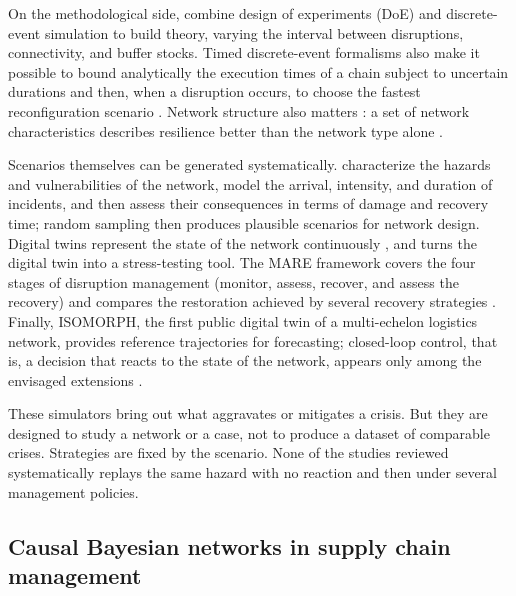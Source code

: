 On the methodological side, \citet{macdonald2018} combine design of experiments (DoE) and discrete-event simulation to build theory, varying the interval between disruptions, connectivity, and buffer stocks. Timed discrete-event formalisms also make it possible to bound analytically the execution times of a chain subject to uncertain durations and then, when a disruption occurs, to choose the fastest reconfiguration scenario \citep{rajah2025}. Network structure also matters \citep{kim2015}: a set of network characteristics describes resilience better than the network type alone \citep{li2020}.

Scenarios themselves can be generated systematically. \citet{klibi2012ejor} characterize the hazards and vulnerabilities of the network, model the arrival, intensity, and duration of incidents, and then assess their consequences in terms of damage and recovery time; random sampling then produces plausible scenarios for network design. Digital twins represent the state of the network continuously \citep{ivanovdolgui2021ppc}, and \citet{ivanov2023} turns the digital twin into a stress-testing tool. The MARE framework covers the four stages of disruption management (monitor, assess, recover, and assess the recovery) and compares the restoration achieved by several recovery strategies \citep{ramzy2022}. Finally, ISOMORPH, the first public digital twin of a multi-echelon logistics network, provides reference trajectories for forecasting; closed-loop control, that is, a decision that reacts to the state of the network, appears only among the envisaged extensions \citep{zhang2026isomorph}.

These simulators bring out what aggravates or mitigates a crisis. But they are designed to study a network or a case, not to produce a dataset of comparable crises. Strategies are fixed by the scenario. None of the studies reviewed systematically replays the same hazard with no reaction and then under several management policies.

\subsection{Causal Bayesian networks in supply chain management}
\label{sec:ea-rb}

